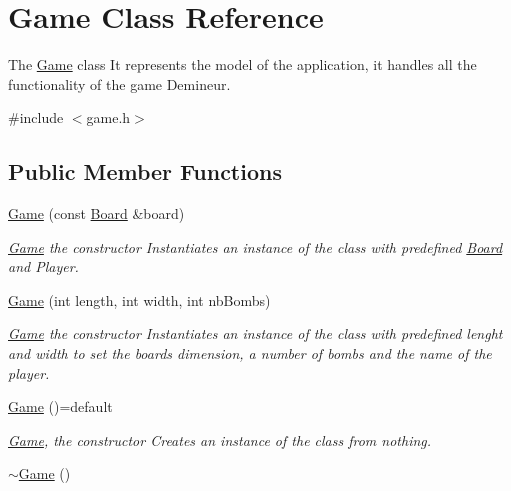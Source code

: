 \hypertarget{class_game}{}\section{Game Class Reference}
\label{class_game}


The \hyperlink{class_game}{Game} class It represents the model of the application, it handles all the functionality of the game Demineur.  




{\ttfamily \#include $<$game.\+h$>$}

\subsection*{Public Member Functions}
\begin{DoxyCompactItemize}
\item 
\hyperlink{class_game_a4db83a8aaf9743aa8f15d6e3c03d9e40}{Game} (const \hyperlink{class_board}{Board} \&board)
\begin{DoxyCompactList}\small\item\em \hyperlink{class_game}{Game} the constructor Instantiates an instance of the class with predefined \hyperlink{class_board}{Board} and Player. \end{DoxyCompactList}\item 
\hyperlink{class_game_ae130acf9aed6f46c32802fb6da8187b1}{Game} (int length, int width, int nb\+Bombs)
\begin{DoxyCompactList}\small\item\em \hyperlink{class_game}{Game} the constructor Instantiates an instance of the class with predefined lenght and width to set the board\textquotesingle{}s dimension, a number of bombs and the name of the player. \end{DoxyCompactList}\item 
\mbox{\label{class_game_a4735989677c1cab18866f3ae4ee0aa1c}} 
\hyperlink{class_game_a4735989677c1cab18866f3ae4ee0aa1c}{Game} ()=default
\begin{DoxyCompactList}\small\item\em \hyperlink{class_game}{Game}, the constructor Creates an instance of the class from nothing. \end{DoxyCompactList}\item 
\mbox{\label{class_game_ae3d112ca6e0e55150d2fdbc704474530}} 
\hyperlink{class_game_ae3d112ca6e0e55150d2fdbc704474530}{$\sim$\+Game} ()

\end{DoxyCompactItemize}
